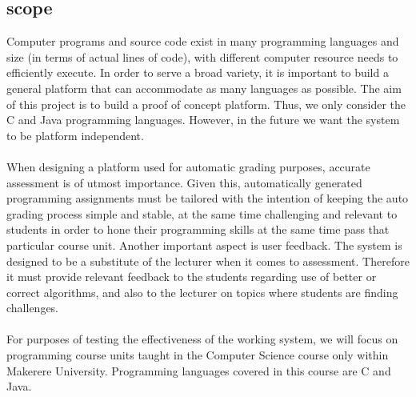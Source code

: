 \documentclass[11pt]{article}
\begin{document}
	\subsection{scope}
		Computer programs and source code exist in many programming languages and size (in
		terms of actual lines of code), with different computer resource needs to efficiently execute.
		In order to serve a broad variety, it is important to build a general platform that can
		accommodate as many languages as possible. The aim of this project is to build a proof of
		concept platform. Thus, we only consider the C and Java programming languages.
		However, in the future we want the system to be platform independent. \\ \\
			When designing a platform used for automatic grading purposes, accurate assessment is of
		utmost importance. Given this, automatically generated programming assignments must be
		tailored with the intention of keeping the auto grading process simple and stable, at the
		same time challenging and relevant to students in order to hone their programming skills
		at the same time pass that particular course unit. Another important aspect is user feedback.
		The system is designed to be a substitute of the lecturer when it comes to assessment.
		Therefore it must provide relevant feedback to the students regarding use of better or
		correct algorithms, and also to the lecturer on topics where students are finding challenges.\\ \\
			For purposes of testing the effectiveness of the working system, we will focus on
		programming course units taught in the Computer Science course only within Makerere
		University. Programming languages covered in this course are C and Java.
\end{document}

